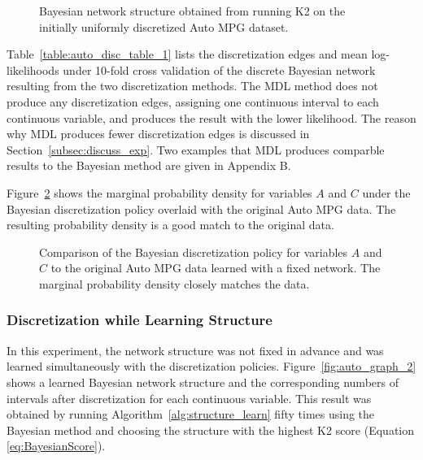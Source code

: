 \begin{figure}[ht]
  \centering
   
   \caption{Bayesian network structure obtained from running K2 on the initially uniformly discretized Auto MPG dataset.}
  \label{fig:auto_graph_1}
\end{figure}

Table~\ref{table:auto_disc_table_1} lists the discretization edges and mean log-likelihoods under \num{10}-fold cross validation of the discrete Bayesian network resulting from the two discretization methods.
The MDL method does not produce any discretization edges, assigning one continuous interval to each continuous variable, and produces the result with the lower likelihood.
The reason why MDL produces fewer discretization edges is discussed in Section~\ref{subsec:discuss_exp}.
Two examples that MDL produces comparble results to the Bayesian method are given in Appendix B.

\begin{table}[ht]
  \centering
  \caption{
    Discretization result of the Auto MPG dataset with fixed structure from Figure~\ref{fig:auto_graph_1}.
    The first five rows list the discretization edges and the last row lists the mean cross-validated log-likelihood; positive values are better.
  }
  
  \label{table:auto_disc_table_1}
\end{table}

Figure~\ref{fig:auto_exp1_distr_1_3} shows the marginal probability density for variables $A$ and $C$ under the Bayesian discretization policy overlaid with the original Auto MPG data.
The resulting probability density is a good match to the original data.

\begin{figure}[ht]
  \centering
  
  \caption{
    Comparison of the Bayesian discretization policy for variables $A$ and $C$ to the original Auto MPG data learned with a fixed network.
    The marginal probability density closely matches the data.
  }
  \label{fig:auto_exp1_distr_1_3}
\end{figure}

\subsubsection{Discretization while Learning Structure}
\label{subsubsec:auto_exp2}

In this experiment, the network structure was not fixed in advance and was learned simultaneously with the discretization policies.
Figure~\ref{fig:auto_graph_2} shows a learned Bayesian network structure and the corresponding numbers of intervals after discretization for each continuous variable.
This result was obtained by running Algorithm~\ref{alg:structure_learn} fifty times using the Bayesian method and choosing the structure with the highest K2 score (Equation \ref{eq:BayesianScore}).

